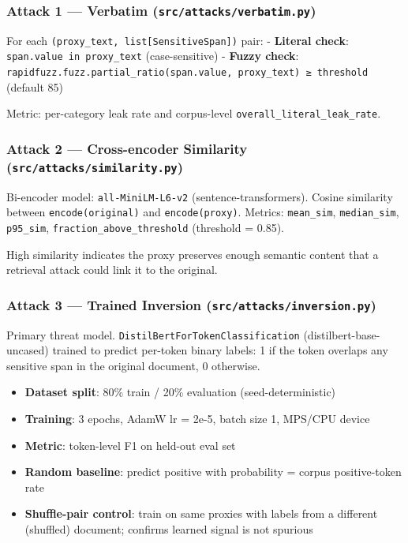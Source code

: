 \subsubsection{\texorpdfstring{Attack 1 --- Verbatim
(\texttt{src/attacks/verbatim.py})}{Attack 1 --- Verbatim (src/attacks/verbatim.py)}}\label{attack-1-verbatim-srcattacksverbatim.py}

For each \texttt{(proxy\_text,\ list{[}SensitiveSpan{]})} pair: -
\textbf{Literal check}: \texttt{span.value\ in\ proxy\_text}
(case-sensitive) - \textbf{Fuzzy check}:
\texttt{rapidfuzz.fuzz.partial\_ratio(span.value,\ proxy\_text)\ ≥\ threshold}
(default 85)

Metric: per-category leak rate and corpus-level
\texttt{overall\_literal\_leak\_rate}.

\subsubsection{\texorpdfstring{Attack 2 --- Cross-encoder Similarity
(\texttt{src/attacks/similarity.py})}{Attack 2 --- Cross-encoder Similarity (src/attacks/similarity.py)}}\label{attack-2-cross-encoder-similarity-srcattackssimilarity.py}

Bi-encoder model: \texttt{all-MiniLM-L6-v2} (sentence-transformers).
Cosine similarity between \texttt{encode(original)} and
\texttt{encode(proxy)}. Metrics: \texttt{mean\_sim},
\texttt{median\_sim}, \texttt{p95\_sim},
\texttt{fraction\_above\_threshold} (threshold = 0.85).

High similarity indicates the proxy preserves enough semantic content
that a retrieval attack could link it to the original.

\subsubsection{\texorpdfstring{Attack 3 --- Trained Inversion
(\texttt{src/attacks/inversion.py})}{Attack 3 --- Trained Inversion (src/attacks/inversion.py)}}\label{attack-3-trained-inversion-srcattacksinversion.py}

Primary threat model. \texttt{DistilBertForTokenClassification}
(distilbert-base-uncased) trained to predict per-token binary labels: 1
if the token overlaps any sensitive span in the original document, 0
otherwise.

\begin{itemize}
\tightlist
\item
  \textbf{Dataset split}: 80\% train / 20\% evaluation
  (seed-deterministic)
\item
  \textbf{Training}: 3 epochs, AdamW lr = 2e-5, batch size 1, MPS/CPU
  device
\item
  \textbf{Metric}: token-level F1 on held-out eval set
\item
  \textbf{Random baseline}: predict positive with probability = corpus
  positive-token rate
\item
  \textbf{Shuffle-pair control}: train on same proxies with labels from
  a different (shuffled) document; confirms learned signal is not
  spurious
\end{itemize}

